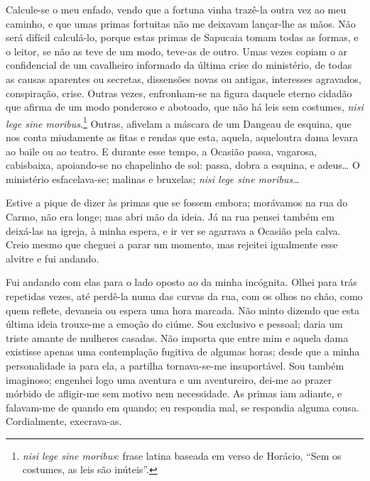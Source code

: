 Calcule-se o meu enfado, vendo que a fortuna vinha trazê-la outra vez ao
meu caminho, e que umas primas fortuitas não me deixavam lançar-lhe as
mãos. Não será difícil calculá-lo, porque estas primas de Sapucaia tomam
todas as formas, e o leitor, se não as teve de um modo, teve-as de
outro. Umas vezes copiam o ar confidencial de um cavalheiro informado da
última crise do ministério, de todas as causas aparentes ou secretas,
dissensões novas ou antigas, interesses agravados, conspiração, crise.
Outras vezes, enfronham-se na figura daquele eterno cidadão que afirma
de um modo ponderoso e abotoado, que não há leis sem costumes,
\emph{nisi lege sine moribus}.\footnote{\emph{nisi lege sine moribus}:
  frase latina baseada em verso de Horácio, ``Sem os costumes, as leis
  são inúteis''.} Outras, afivelam a máscara de um Dangeau de esquina,
que nos conta miudamente as fitas e rendas que esta, aquela, aqueloutra
dama levara ao baile ou ao teatro. E durante esse tempo, a Ocasião
passa, vagarosa, cabisbaixa, apoiando-se no chapelinho de sol: passa,
dobra a esquina, e adeus\ldots{} O ministério esfacelava-se; malinas e
bruxelas; \emph{nisi lege sine moribus}\ldots{}

Estive a pique de dizer às primas que se fossem embora; morávamos na rua
do Carmo, não era longe; mas abri mão da ideia. Já na rua pensei também
em deixá-las na igreja, à minha espera, e ir ver se agarrava a Ocasião
pela calva. Creio mesmo que cheguei a parar um momento, mas rejeitei
igualmente esse alvitre e fui andando.

Fui andando com elas para o lado oposto ao da minha incógnita. Olhei
para trás repetidas vezes, até perdê-la numa das curvas da rua, com os
olhos no chão, como quem reflete, devaneia ou espera uma hora marcada.
Não minto dizendo que esta última ideia trouxe-me a emoção do ciúme. Sou
exclusivo e pessoal; daria um triste amante de mulheres casadas. Não
importa que entre mim e aquela dama existisse apenas uma contemplação
fugitiva de algumas horas; desde que a minha personalidade ia para ela,
a partilha tornava-se-me insuportável. Sou também imaginoso; engenhei
logo uma aventura e um aventureiro, dei-me ao prazer mórbido de
afligir-me sem motivo nem necessidade. As primas iam adiante, e
falavam-me de quando em quando; eu respondia mal, se respondia alguma
cousa. Cordialmente, execrava-as.

